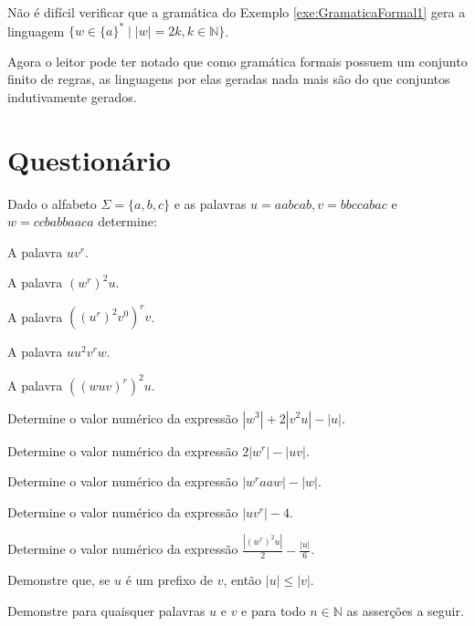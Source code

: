 \begin{exemplo}
	Não é difícil verificar que a gramática do Exemplo \ref{exe:GramaticaFormal1} gera a linguagem $\{w \in \{a\}^* \mid |w| = 2k, k \in \mathbb{N}\}$.
\end{exemplo}

Agora o leitor pode ter notado que como gramática formais possuem um conjunto finito de regras, as linguagens por elas geradas nada mais são do que conjuntos indutivamente gerados.

\section{Questionário}\label{sec:Questionario1part4}

\begin{questao}\label{exer:LF1}
	Dado o alfabeto $\Sigma = \{a, b, c\}$ e as palavras $u = aabcab, v = bbccabac$ e $w = ccbabbaaca$ determine:
\end{questao}

\begin{exerList}
	\item A palavra $uv^r$.
	\item A palavra $(w^r)^2u$.
	\item A palavra $((u^r)^2v^0)^rv$.
	\item A palavra $uu^2v^rw$.
	\item A palavra $((wuv)^r)^2u$.
	\item Determine o valor numérico da expressão $|w^3| + 2|v^2u| - |u|$.
	\item Determine o valor numérico da expressão $2|w^r| - |uv|$.
	\item Determine o valor numérico da expressão $|w^raaw| - |w|$.
	\item Determine o valor numérico da expressão $|uv^r| - 4$.
	\item Determine o valor numérico da expressão $\frac{|(w^r)^2u|}{2} - \frac{|u|}{6}$.
\end{exerList}


\begin{questao}\label{exer:LF2.0}
	Demonstre que, se $u$ é um prefixo de $v$, então $|u| \leq |v|$.
\end{questao}


\begin{questao}\label{exer:LF2}
	Demonstre para quaisquer palavras $u$ e $v$ e para todo $n \in \mathbb{N}$ as asserções a seguir.
\end{questao}

